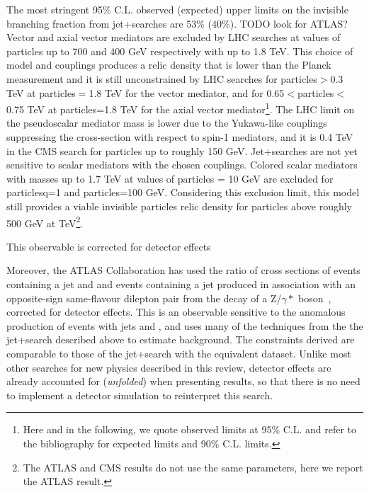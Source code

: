 The most stringent 95\% C.L. observed (expected) upper limits on the invisible branching
fraction from jet+\MET searches are 53\% (40\%).  TODO look for ATLAS?
Vector and axial vector mediators are excluded by LHC searches at values of \minvisible particles up to 700 and 400 GeV respectively with \mmed up to 1.8 TeV. This choice of model and couplings produces a relic density that is lower than the Planck measurement and it is still unconstrained by LHC searches for \minvisible particles$>$0.3 TeV at \minvisible particles$=$1.8 TeV for the vector mediator, and for 0.65$<$\minvisible particles$<$0.75 TeV at \minvisible particles=1.8 TeV for the axial vector mediator\footnote{Here and in the following, we quote observed limits at 95\% C.L. and refer to the bibliography for expected limits and 90\% C.L. limits.}. 
The LHC limit on the pseudoscalar mediator mass is lower due to the Yukawa-like couplings suppressing the cross-section with respect to spin-1 mediators, and it is 0.4 TeV in the CMS search for \minvisible particles up to roughly 150 GeV. 
Jet+\MET searches are not yet sensitive to scalar mediators with the chosen couplings. 
Colored scalar mediators with masses up to 1.7 TeV at values of \minvisible particles = 10 GeV are excluded for \ginvisible particlesq=1 and \minvisible particles=100 GeV. Considering this exclusion limit, this model still provides a viable invisible particles relic density for \mmed \minvisible particles above roughly 500 GeV at  TeV\footnote{The ATLAS and CMS results do not use the same parameters, here we report the ATLAS result.}.




This observable is corrected for detector effects

Moreover, the ATLAS Collaboration has used the ratio of cross sections of events containing a jet and \MET and events containing a jet produced in association with an opposite-sign same-flavour dilepton pair from the decay of a Z/$\gamma*$ boson~\cite{Aaboud:2017buf}, corrected for detector effects. 
This is an observable sensitive to the anomalous production of events with jets and \MET, and uses many of the techniques from the the jet+\MET search described above to estimate background. The constraints derived are comparable to those of the jet+\MET search with the equivalent dataset. Unlike most other searches for new physics described in this review, detector effects are already accounted for (\textit{unfolded}) when presenting results, so that there is no need to implement a detector simulation to reinterpret this search. 


